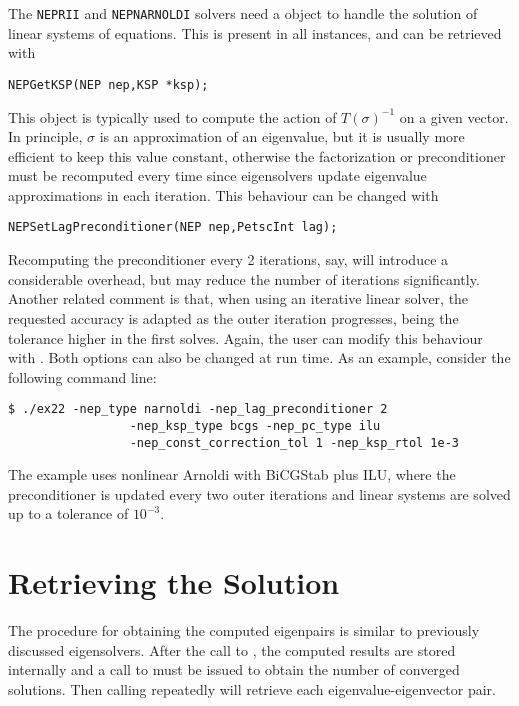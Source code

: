 The \texttt{NEPRII} and \texttt{NEPNARNOLDI} solvers need a  object to handle the solution of linear systems of equations. This  is present in all  instances, and can be retrieved with
	\begin{Verbatim}[fontsize=\small]
	NEPGetKSP(NEP nep,KSP *ksp);
	\end{Verbatim}

This  object is typically used to compute the action of $T(\sigma)^{-1}$ on a given vector. In principle, $\sigma$ is an approximation of an eigenvalue, but it is usually more efficient to keep this value constant, otherwise the factorization or preconditioner must be recomputed every time since eigensolvers update eigenvalue approximations in each iteration. This behaviour can be changed with
	\begin{Verbatim}[fontsize=\small]
	NEPSetLagPreconditioner(NEP nep,PetscInt lag);
	\end{Verbatim}
Recomputing the preconditioner every 2 iterations, say, will introduce a considerable overhead, but may reduce the number of iterations significantly. Another related comment is that, when using an iterative linear solver, the requested accuracy is adapted as the outer iteration progresses, being the tolerance higher in the first solves. Again, the user can modify this behaviour with . Both options can also be changed at run time. As an example, consider the following command line:
\begin{Verbatim}[fontsize=\small]
	$ ./ex22 -nep_type narnoldi -nep_lag_preconditioner 2
                 -nep_ksp_type bcgs -nep_pc_type ilu
                 -nep_const_correction_tol 1 -nep_ksp_rtol 1e-3
\end{Verbatim}
The example uses nonlinear Arnoldi with BiCGStab plus ILU, where the preconditioner is updated every two outer iterations and linear systems are solved up to a tolerance of $10^{-3}$.

\section{Retrieving the Solution}

The procedure for obtaining the computed eigenpairs is similar to previously discussed eigensolvers. After the call to , the computed results are stored internally and a call to  must be issued to obtain the number of converged solutions. Then calling  repeatedly will retrieve each eigenvalue-eigenvector pair.


